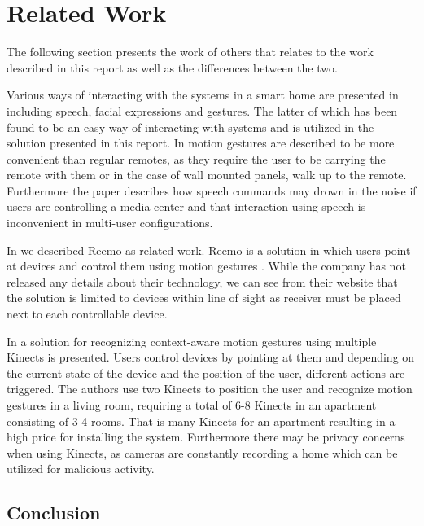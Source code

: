 \section{Related Work}
\label{sec:related-work}

The following section presents the work of others that relates to the work described in this report as well as the differences between the two.

Various ways of interacting with the systems in a smart home are presented in \cite[pp. 9-10]{cook2007smart} including speech, facial expressions and gestures. The latter of which has been found to be an easy way of interacting with systems \cite[p. 6]{rahman2011motion} and is utilized in the solution presented in this report. In \cite[pp. 2-3]{starner2000gesture} motion gestures are described to be more convenient than regular remotes, as they require the user to be carrying the remote with them or in the case of wall mounted panels, walk up to the remote. Furthermore the paper describes how speech commands may drown in the noise if users are controlling a media center and that interaction using speech is inconvenient in multi-user configurations.

In \cite[pp. 9-11]{prespecialisation} we described Reemo as related work. Reemo is a solution in which users point at devices and control them using motion gestures \cite{reemo:about}. While the company has not released any details about their technology, we can see from their website that the solution is limited to devices within line of sight as receiver must be placed next to each controllable device.

In \cite{caon2011context} a solution for recognizing context-aware motion gestures using multiple Kinects is presented. Users control devices by pointing at them and depending on the current state of the device and the position of the user, different actions are triggered.
The authors use two Kinects to position the user and recognize motion gestures in a living room, requiring a total of 6-8 Kinects in an apartment consisting of 3-4 rooms. That is many Kinects for an apartment resulting in a high price for installing the system. Furthermore there may be privacy concerns when using Kinects, as cameras are constantly recording a home which can be utilized for malicious activity.

\subsection{Conclusion}

